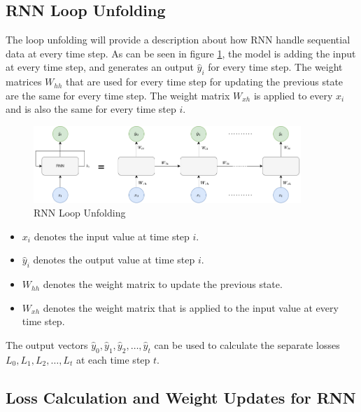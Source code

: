         \subsection{RNN Loop Unfolding}
        \label{sec:rnn-loop-unfolding-background}

            The loop unfolding will provide a description about how RNN handle sequential data at every time step.
            As can be seen in figure \ref{fig:rnn-loop-unfolding}, the model is adding the input at every time step, and generates an output $\hat{y}_i$ for every time step.
            The weight matrices $W_{hh}$ that are used for every time step for updating the previous state are the same for every time step.
            The weight matrix $W_{xh}$ is applied to every $x_i$ and is also the same for every time step $i$.

            \begin{figure}[h!]
                \centering
                \includegraphics[width=0.90\textwidth]{figures/rnn_loop_unfolding.drawio.png}
                \caption{RNN Loop Unfolding}
                \label{fig:rnn-loop-unfolding}
            \end{figure}
            \begin{itemize}[label=\textemdash]
                \item $x_i$ denotes the input value at time step $i$.
                \item $\hat{y}_i$ denotes the output value at time step $i$.
                \item $W_{hh}$ denotes the weight matrix to update the previous state.
                \item $W_{xh}$ denotes the weight matrix that is applied to the input value at every time step.
            \end{itemize}
            The output vectors $\hat{y}_0, \hat{y}_1, \hat{y}_2, \dots, \hat{y}_t$ can be used to calculate the separate losses $L_0, L_1, L_2, \dots, L_t$ at each time step $t$.

        \subsection{Loss Calculation and Weight Updates for RNN}
        \label{sec:loss-calculation-and-weight-updates-for-rnn-background}
        
